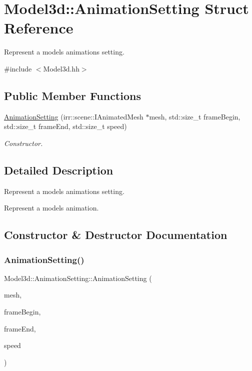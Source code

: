 \hypertarget{structModel3d_1_1AnimationSetting}{}\section{Model3d\+:\+:Animation\+Setting Struct Reference}
\label{structModel3d_1_1AnimationSetting}


Represent a model\textquotesingle{}s animation\textquotesingle{}s setting.  




{\ttfamily \#include $<$Model3d.\+hh$>$}

\subsection*{Public Member Functions}
\begin{DoxyCompactItemize}
\item 
\hyperlink{structModel3d_1_1AnimationSetting_acd9f22875f006130f81d50939a4348d6}{Animation\+Setting} (irr\+::scene\+::\+I\+Animated\+Mesh $\ast$mesh, std\+::size\+\_\+t frame\+Begin, std\+::size\+\_\+t frame\+End, std\+::size\+\_\+t speed)
\begin{DoxyCompactList}\small\item\em Constructor. \end{DoxyCompactList}\end{DoxyCompactItemize}


\subsection{Detailed Description}
Represent a model\textquotesingle{}s animation\textquotesingle{}s setting. 

Represent a model\textquotesingle{}s animation. 

\subsection{Constructor \& Destructor Documentation}
\mbox{\label{structModel3d_1_1AnimationSetting_acd9f22875f006130f81d50939a4348d6}} 
\subsubsection{\texorpdfstring{Animation\+Setting()}{AnimationSetting()}}
{\footnotesize\ttfamily Model3d\+::\+Animation\+Setting\+::\+Animation\+Setting (\begin{DoxyParamCaption}\item[{irr\+::scene\+::\+I\+Animated\+Mesh $\ast$}]{mesh,  }\item[{std\+::size\+\_\+t}]{frame\+Begin,  }\item[{std\+::size\+\_\+t}]{frame\+End,  }\item[{std\+::size\+\_\+t}]{speed }\end{DoxyParamCaption})}



